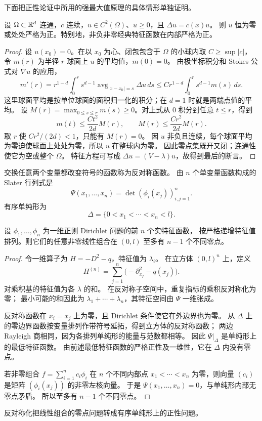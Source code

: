 下面把正性论证中所用的强最大值原理的具体情形单独证明。
\begin{lemma}[非负经典解的强正性]\label{lem:nonnegative-elliptic-positive}
设 $\Omega\subset\mathbb{R}^d$ 连通，$c$ 连续，$u\in C^2(\Omega)$、$u\geq0$，且 $\Delta u=c(x)u$。
则 $u$ 恒为零或处处严格为正。特别地，非负非零经典特征函数在内部严格为正。
\end{lemma}
\begin{proof}
设 $u(x_0)=0$。在以 $x_0$ 为心、闭包包含于 $\Omega$ 的小球内取 $C\geq\sup|c|$，
令 $m(r)$ 为半径 $r$ 球面上 $u$ 的平均值，$m(0)=0$。
由极坐标积分和 Stokes 公式对 $\nabla u$ 的应用，
\[
 m'(r)=r^{1-d}\int_0^r s^{d-1}\operatorname{avg}_{|x-x_0|=s}\Delta u\,ds
 \leq C r^{1-d}\int_0^r s^{d-1}m(s)\,ds.
\]
这里球面平均是按单位球面的面积归一化的积分；在 $d=1$ 时就是两端点值的平均。
设 $M(r)=\max_{0\leq s\leq r}m(s)\geq0$。对上式从 0 积分到任意 $t\leq r$，得到
\[
 m(t)\leq \frac{Ct^2}{2d}M(r),\qquad
 M(r)\leq\frac{Cr^2}{2d}M(r).
\]
取 $r$ 使 $Cr^2/(2d)<1$，只能有 $M(r)=0$。
因 $u$ 非负且连续，每个球面平均为零迫使球面上处处为零，所以 $u$ 在整球内为零。
因此零点集既开又闭；连通性使它为空或整个 $\Omega$。
特征方程可写成 $\Delta u=(V-\lambda)u$，故得到最后的断言。
\end{proof}

\begin{definition}
交换任意两个变量都改变符号的函数称为反对称函数。
由 $n$ 个单变量函数构成的 Slater 行列式是
\[
 \Psi(x_1,\ldots,x_n)=\det(\phi_i(x_j))_{i,j=1}^n.
\]
有序单纯形为 
\[
 \Delta=\{0<x_1<\cdots<x_n<l\}.
\]
\end{definition}
\begin{theorem}
设 $\phi_1,\ldots,\phi_n$ 为一维正则 Dirichlet 问题的前 $n$ 个实特征函数，
按严格递增特征值排列。则它们的任意非零线性组合在 $(0,l)$ 至多有 $n-1$ 个不同零点。
\end{theorem}
\begin{proof}
令一维算子为 $H=-D^2-q$，特征值为 $\lambda_i$。
在立方体 $(0,l)^n$ 上，定义
\[
 H^{(n)}=\sum_{j=1}^n\bigl(-\partial_{x_j}^2-q(x_j)\bigr).
\]
对乘积基的特征值为各 $\lambda$ 的和。
在反对称子空间中，重复指标的乘积反对称化为零；
最小可能的和因此为 $\lambda_1+\cdots+\lambda_n$，其特征空间由 $\Psi$ 一维张成。

反对称函数在 $x_i=x_j$ 上为零，且 Dirichlet 条件使它在外边界也为零。
从 $\Delta$ 上的零边界函数按变量排列作带符号延拓，得到立方体的反对称函数；
两边 Rayleigh 商相同，因为各排列单纯形的能量与范数都相等。
因此 $\Psi|_\Delta$ 是单纯形上的最低特征函数。
由前述最低特征函数的严格正性及一维性，它在 $\Delta$ 内没有零点。

若非零组合 $f=\sum_{i=1}^nc_i\phi_i$ 在 $n$ 个不同内部点
$x_1<\cdots<x_n$ 为零，则向量 $(c_i)$ 是矩阵 $(\phi_i(x_j))$ 的非零左核向量。
于是 $\Psi(x_1,\ldots,x_n)=0$，与单纯形内部无零点矛盾。
所以至多有 $n-1$ 个不同零点。
\end{proof}
反对称化把线性组合的零点问题转成有序单纯形上的正性问题。

